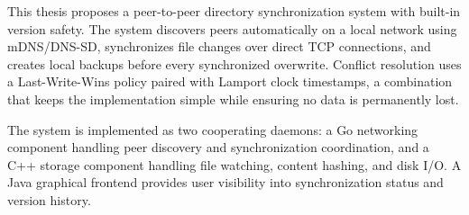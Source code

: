 \documentclass[12pt,oneside]{report}
\begin{document}
This thesis proposes a peer-to-peer directory synchronization system with built-in version safety. The system discovers peers automatically on a local network using mDNS/DNS-SD, synchronizes file changes over direct TCP connections, and creates local backups before every synchronized overwrite. Conflict resolution uses a Last-Write-Wins policy paired with Lamport clock timestamps, a combination that keeps the implementation simple while ensuring no data is permanently lost.

The system is implemented as two cooperating daemons: a Go networking component handling peer discovery and synchronization coordination, and a C++ storage component handling file watching, content hashing, and disk I/O. A Java graphical frontend provides user visibility into synchronization status and version history.

\newpage
\tableofcontents
\newpage









\newpage




\end{document}
